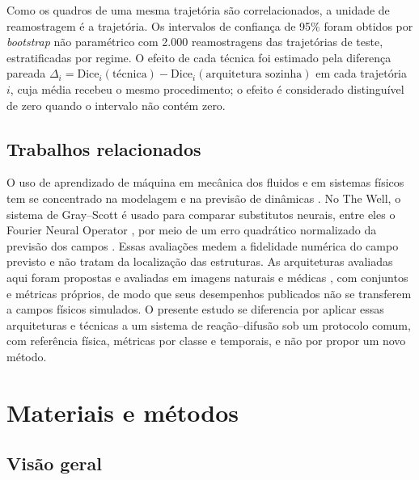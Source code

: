 \documentclass[12pt]{article}
\begin{document}
Como os quadros de uma mesma trajetória são correlacionados, a unidade de reamostragem é a trajetória. Os intervalos de confiança de 95\% foram obtidos por \textit{bootstrap} não paramétrico \cite{efron1993} com 2.000 reamostragens das trajetórias de teste, estratificadas por regime. O efeito de cada técnica foi estimado pela diferença pareada $\Delta_i=\mathrm{Dice}_i(\text{técnica})-\mathrm{Dice}_i(\text{arquitetura sozinha})$ em cada trajetória $i$, cuja média recebeu o mesmo procedimento; o efeito é considerado distinguível de zero quando o intervalo não contém zero.

\subsection{Trabalhos relacionados}
\label{subsec:relacionados}

O uso de aprendizado de máquina em mecânica dos fluidos e em sistemas físicos tem se concentrado na modelagem e na previsão de dinâmicas \cite{brunton2020}. No The Well, o sistema de Gray--Scott é usado para comparar substitutos neurais, entre eles o Fourier Neural Operator \cite{li2021fno}, por meio de um erro quadrático normalizado da previsão dos campos \cite{ohana2024well}. Essas avaliações medem a fidelidade numérica do campo previsto e não tratam da localização das estruturas. As arquiteturas avaliadas aqui foram propostas e avaliadas em imagens naturais e médicas \cite{ronneberger2015unet,xie2021segformer,cheng2022mask2former}, com conjuntos e métricas próprios, de modo que seus desempenhos publicados não se transferem a campos físicos simulados. O presente estudo se diferencia por aplicar essas arquiteturas e técnicas a um sistema de reação--difusão sob um protocolo comum, com referência física, métricas por classe e temporais, e não por propor um novo método.

\section{Materiais e métodos}
\label{sec:metodos}

\subsection{Visão geral}
\label{subsec:visao-geral}
\end{document}
